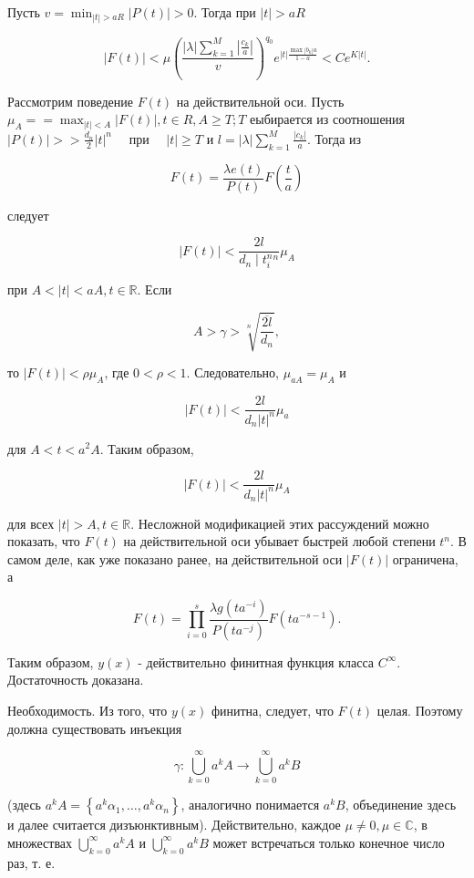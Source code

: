 \documentclass[10pt]{article}
\begin{document}
Пусть $v=\min _{|t|>a R}|P(t)|>0$. Тогда при $|t|>a R$

$$
|F(t)|<\mu\left(\frac{|\lambda| \sum_{k=1}^{M}\left|\frac{c_{k}}{a}\right|}{v}\right)^{q_{0}} e^{|t| \frac{\max \left|b_{k}\right| a}{1-a}}<C e^{K|t|} .
$$

Рассмотрим поведение $F(t)$ на действительной оси. Пусть $\mu_{A}= =\max _{|t|<A}|F(t)|, t \in R, A \geqslant T ; T$ еыбирается из соотношения $|P(t)|> >\frac{d_{n}}{2}|t|^{n} \quad$ при $\quad|t| \geqslant T$ и $l=|\lambda| \sum_{k=1}^{M} \frac{\left|c_{k}\right|}{a}$. Тогда из

$$
F(t)=\frac{\lambda e(t)}{P(t)} F\left(\frac{t}{a}\right)
$$

следует

$$
|F(t)|<\frac{2 l}{d_{n} \mid t_{i}^{n}{ }^{n}} \mu_{A}
$$

при $A<|t|<a A, t \in \mathbb{R}$. Если

$$
A>\gamma>\sqrt[n]{\frac{\overline{2 l}}{d_{n}}},
$$

то $|F(t)|<\rho \mu_{A}$, где $0<\rho<1$. Следовательно, $\mu_{a A}=\mu_{A}$ и

$$
|F(t)|<\frac{2 l}{d_{n}|t|^{n}} \mu_{a}
$$

для $A<t<a^{2} A$. Таким образом,

$$
|F(t)|<\frac{2 l}{d_{n}|t|^{n}} \mu_{A}
$$

для всех $|t|>A, t \in \mathbb{R}$. Несложной модификацией этих рассуждений можно показать, что $F(t)$ на действительной оси убывает быстрей любой степени $t^{n}$. В самом деле, как уже показано ранее, на действительной оси $|F(t)|$ ограничена, а

$$
F(t)=\prod_{i=0}^{s} \frac{\lambda g\left(t a^{-i}\right)}{P\left(t a^{-j}\right)} F\left(t a^{-s-1}\right) .
$$

Таким образом, $y(x)$ - действительно финитная функция класса $C^{\infty}$. Достаточность доказана.

Необходимость. Из того, что $y(x)$ финитна, следует, что $F(t)$ целая. Поэтому должна существовать инъекция

$$
\gamma: \bigcup_{k=0}^{\infty} a^{k} A \rightarrow \bigcup_{k=0}^{\infty} a^{k} B
$$

(здесь $a^{k} A=\left\{a^{k} \alpha_{1}, \ldots, a^{k} \alpha_{n}\right\}$, аналогично понимается $a^{k} B$, объединение здесь и далее считается дизъюнктивным). Действительно, каждое $\mu \neq 0, \mu \in \mathbb{C}$, в множествах $\bigcup_{k=0}^{\infty} a^{k} A$ и $\bigcup_{k=0}^{\infty} a^{k} B$ может встречаться только конечное число раз, т. е.
\end{document}
